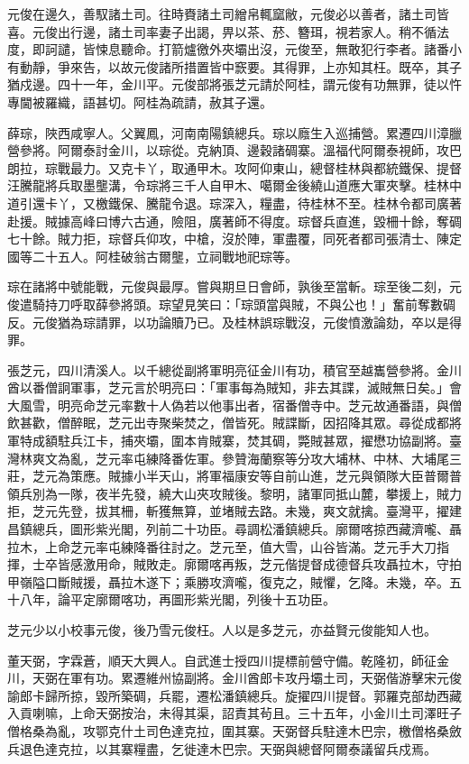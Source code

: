 \begin{pinyinscope}
元俊在邊久，善馭諸土司。往時賚諸土司繒帛輒窳敝，元俊必以善者，諸土司皆喜。元俊出行邊，諸土司率妻子出謁，畀以茶、菸、簪珥，視若家人。稍不循法度，即訶譴，皆悚息聽命。打箭爐徼外夾壩出沒，元俊至，無敢犯行李者。諸番小有動靜，爭來告，以故元俊諸所措置皆中窾要。其得罪，上亦知其枉。既卒，其子猶戍邊。四十一年，金川平。元俊部將張芝元請於阿桂，謂元俊有功無罪，徒以忤專閫被羅織，語甚切。阿桂為疏請，赦其子還。

薛琮，陜西咸寧人。父翼鳳，河南南陽鎮總兵。琮以廕生入巡捕營。累遷四川漳臘營參將。阿爾泰討金川，以琮從。克納頂、邊穀諸碉寨。溫福代阿爾泰視師，攻巴朗拉，琮戰最力。又克卡丫，取通甲木。攻阿仰東山，總督桂林與都統鐵保、提督汪騰龍將兵取墨壟溝，令琮將三千人自甲木、噶爾金後繞山道應大軍夾擊。桂林中道引還卡丫，又檄鐵保、騰龍令退。琮深入，糧盡，待桂林不至。桂林令都司廣著赴援。賊據高峰曰博六古通，險阻，廣著師不得度。琮督兵直進，毀柵十餘，奪碉七十餘。賊力拒，琮督兵仰攻，中槍，沒於陣，軍盡覆，同死者都司張清士、陳定國等二十五人。阿桂破翁古爾壟，立祠戰地祀琮等。

琮在諸將中號能戰，元俊與最厚。嘗與期旦日會師，孰後至當斬。琮至後二刻，元俊遣騎持刀呼取薛參將頭。琮望見笑曰：「琮頭當與賊，不與公也！」奮前奪數碉反。元俊猶為琮請罪，以功論贖乃已。及桂林誤琮戰沒，元俊憤激論劾，卒以是得罪。

張芝元，四川清溪人。以千總從副將軍明亮征金川有功，積官至越巂營參將。金川酋以番僧詗軍事，芝元言於明亮曰：「軍事每為賊知，非去其諜，滅賊無日矣。」會大風雪，明亮命芝元率數十人偽若以他事出者，宿番僧寺中。芝元故通番語，與僧飲甚歡，僧醉眠，芝元出寺聚柴焚之，僧皆死。賊諜斷，因招降其眾。尋從成都將軍特成額駐兵江卡，捕夾壩，圍本肯賊寨，焚其碉，斃賊甚眾，擢懋功協副將。臺灣林爽文為亂，芝元率屯練降番佐軍。參贊海蘭察等分攻大埔林、中林、大埔尾三莊，芝元為策應。賊據小半天山，將軍福康安等自前山進，芝元與領隊大臣普爾普領兵別為一隊，夜半先發，繞大山夾攻賊後。黎明，諸軍同抵山麓，攀援上，賊力拒，芝元先登，拔其柵，斬獲無算，並堵賊去路。未幾，爽文就擒。臺灣平，擢建昌鎮總兵，圖形紫光閣，列前二十功臣。尋調松潘鎮總兵。廓爾喀掠西藏濟嚨、聶拉木，上命芝元率屯練降番往討之。芝元至，值大雪，山谷皆滿。芝元手大刀指揮，士卒皆感激用命，賊敗走。廓爾喀再叛，芝元偕提督成德督兵攻聶拉木，守拍甲嶺隘口斷賊援，聶拉木遂下；乘勝攻濟嚨，復克之，賊懼，乞降。未幾，卒。五十八年，論平定廓爾喀功，再圖形紫光閣，列後十五功臣。

芝元少以小校事元俊，後乃雪元俊枉。人以是多芝元，亦益賢元俊能知人也。

董天弼，字霖蒼，順天大興人。自武進士授四川提標前營守備。乾隆初，師征金川，天弼在軍有功。累遷維州協副將。金川酋郎卡攻丹壩土司，天弼偕游擊宋元俊諭郎卡歸所掠，毀所築碉，兵罷，遷松潘鎮總兵。旋擢四川提督。郭羅克部劫西藏入貢喇嘛，上命天弼按治，未得其渠，詔責其茍且。三十五年，小金川土司澤旺子僧格桑為亂，攻鄂克什土司色達克拉，圍其寨。天弼督兵駐達木巴宗，檄僧格桑斂兵退色達克拉，以其寨糧盡，乞徙達木巴宗。天弼與總督阿爾泰議留兵戍焉。


\end{pinyinscope}
